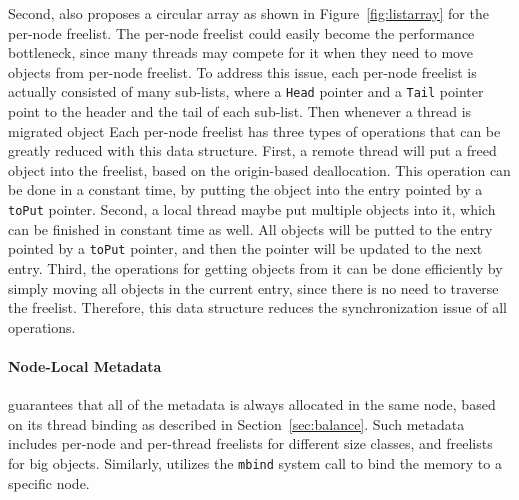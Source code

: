Second, \NM{} also proposes a circular array as shown in Figure~\ref{fig:listarray} for the per-node freelist. The per-node freelist could easily become the performance bottleneck, since many threads may compete for it when they need to move objects from per-node freelist. To address this issue, each per-node freelist is actually consisted of many sub-lists, where a \texttt{Head} pointer and a \texttt{Tail} pointer point to the header and the tail of each sub-list. Then whenever a thread is migrated object  
Each per-node freelist has three types of operations that can be greatly reduced with this data structure. First, a remote thread will put a freed object into the freelist, based on the origin-based deallocation. This operation can be done in a constant time, by putting the object into the entry pointed by a \texttt{toPut} pointer. Second, a local thread maybe put multiple objects into it, which can be finished in constant time as well. All objects will be putted to the entry pointed by a \texttt{toPut} pointer, and then the pointer will be updated to the next entry. Third, the operations for getting objects from it can be done efficiently by simply moving all objects in the current entry, since there is no need to traverse the freelist. Therefore, this data structure reduces the synchronization issue of all operations. 

\paragraph{Node-Local Metadata} \NM{} guarantees that all of the metadata is always allocated in the same node, based on its thread binding as described in Section~\ref{sec:balance}. Such metadata includes per-node and per-thread freelists for different size classes, and freelists for big objects. Similarly, \NM{} utilizes the \texttt{mbind} system call to bind the memory to a specific node.  

